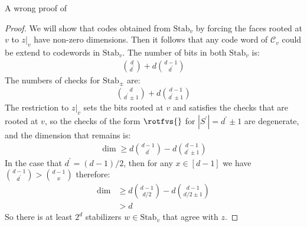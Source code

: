 A wrong proof of 
\begin{proof}
  We will show that codes obtained from $\text{Stab}_{v}$ by forcing the faces rooted at $v$ to $z|_{v}$ have non-zero dimensions. Then it follows that any code word of $\mathcal{C}_{v}$ could be extend to codewords in $\text{Stab}_{v}$. The number of bits in both $\text{Stab}_{v}$ is:
\begin{equation*}
  \begin{split}
      { d \choose d^{\prime} }  +  d { d - 1 \choose d^{\prime} } 
  \end{split}
\end{equation*}
The numbers of checks for $\text{Stab}_{\pm}$ are:
\begin{equation*}
  \begin{split}
 { d \choose d^{\prime} \pm 1 } + d { d-1  \choose d^{\prime} \pm 1 }  
 \end{split}
\end{equation*}
The restriction to $z|_{v}$ sets the bits rooted at $v$ and satisfies the checks that are rooted at $v$, so the checks of the form $\rotfvs{}$ for $|S^{\prime}| = d^{\prime} \pm 1$ are degenerate, and the dimension that remains is:
\begin{equation*}
  \begin{split}
    \dim \ge d { d - 1 \choose d^{\prime} } - d { d-1  \choose d^{\prime} \pm 1 }  
  \end{split}
\end{equation*}
In the case that $d^\prime = (d-1)/2$, then for any $x \in [d-1]$ we have $ { d - 1 \choose d^{\prime} } >  { d-1 \choose x  }  $ therefore:
\begin{equation*}
  \begin{split}
    \dim &\ge d { d - 1 \choose d/2 } - d { d-1  \choose d/2 \pm 1 } \\
    & > d
  \end{split}
\end{equation*}
So there is at least $2^{d}$ stabilizers $w \in \text{Stab}_{v}$ that agree with $z$. 
\end{proof}


